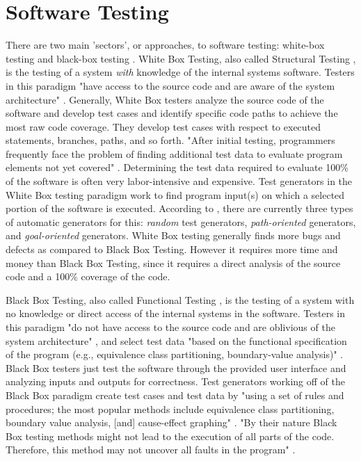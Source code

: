 \documentclass[10pt, final, journal, letterpaper, twoside, twocolumn]{IEEEtran}
\begin{document}
\section{Software Testing}
	There are two main 'sectors', or approaches, to software testing: white-box testing and black-box testing \cite{boxes}. White Box Testing, also called Structural Testing \cite{slide-testing}, is the testing of a system \textit{with} knowledge of the internal systems software. Testers in this paradigm "have access to the source code and are aware of the system architecture" \cite{boxes}. Generally, White Box testers analyze the source code of the software and develop test cases and identify specific code paths to achieve the most raw code coverage. They develop test cases with respect to executed statements, branches, paths, and so forth. "After initial testing, programmers frequently face the problem of finding additional test data to evaluate program elements not yet covered" \cite{assertion}. Determining the test data required to evaluate 100\% of the software is often very labor-intensive and expensive. Test generators in the White Box testing paradigm work to find program input(s) on which a selected portion of the software is executed. According to \cite{assertion}, there are currently three types of automatic generators for this: \textit{random} test generators, \textit{path-oriented} generators, and \textit{goal-oriented} generators. White Box testing generally finds more bugs and defects as compared to Black Box Testing. However it requires more time and money than Black Box Testing, since it requires a direct analysis of the source code and a 100\% coverage of the code.
	
	Black Box Testing, also called Functional Testing \cite{slide-testing}, is the testing of a system with no knowledge or direct access of the internal systems in the software. Testers in this paradigm "do not have access to the source code and are oblivious of the system architecture" \cite{boxes}, and select test data "based on the functional specification of the program (e.g., equivalence class partitioning, boundary-value analysis)" \cite{assertion}. Black Box testers just test the software through the provided user interface and analyzing inputs and outputs for correctness. Test generators working off of the Black Box paradigm create test cases and test data by "using a set of rules and procedures; the most popular methods include equivalence class partitioning, boundary value analysis, [and] cause-effect graphing" \cite{assertion}. "By their nature Black Box testing methods might not lead to the execution of all parts of the code. Therefore, this method may not uncover all faults in the program" \cite{fuzzy-logic}.
	
\end{document}
